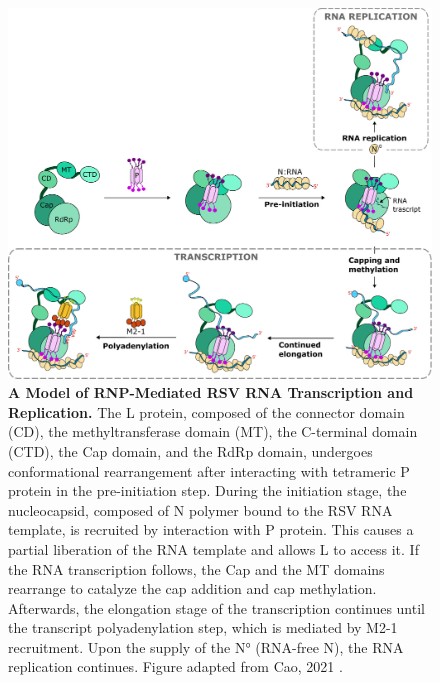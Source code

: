 \begin{figure}
    \centering
    \includegraphics[width=1\linewidth]{04. Introduction//Figs/09. N_p_l_m21-interaction-overview.pdf}
    \caption[A Model of RNP-Mediated RSV RNA Transcription and Replication.]{\textbf{A Model of RNP-Mediated RSV RNA Transcription and Replication.} The L protein, composed of the connector domain (CD), the methyltransferase domain (MT), the C-terminal domain (CTD), the Cap domain, and the RdRp domain, undergoes conformational rearrangement after interacting with tetrameric P protein in the pre-initiation step. During the initiation stage, the nucleocapsid, composed of N polymer bound to the RSV RNA template, is recruited by interaction with P protein. This causes a partial liberation of the RNA template and allows L to access it. If the RNA transcription follows, the Cap and the MT domains rearrange to catalyze the cap addition and cap methylation. Afterwards, the elongation stage of the transcription continues until the transcript polyadenylation step, which is mediated by M2-1 recruitment. Upon the supply of the N° (RNA-free N), the RNA replication continues. Figure adapted from Cao, 2021 \cite{Cao2021StructuralComplexes}.}
    \label{fig:A Model of RNP-Mediated RSV RNA Transcription and Replication}
\end{figure}

